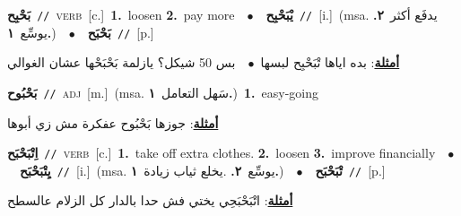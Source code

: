\documentclass[10pt,a4paper,twoside]{article} %
\begin{document}
\begin{multicols}{2}
{{{{{\setlength\topsep{0pt}\textbf{\foreignlanguage{arabic}{بَحْبِح}}\ {\color{gray}\texttt{//}\color{black}}\ \textsc{verb}\ [c.]\ \textbf{1.}~loosen  \textbf{2.}~pay more\ \ $\bullet$\ \ \setlength\topsep{0pt}\textbf{\foreignlanguage{arabic}{يْبَحْبِح}}\ {\color{gray}\texttt{//}\color{black}}\ [i.]\ \color{gray}(msa. \foreignlanguage{arabic}{يدفَع أكثر}~\foreignlanguage{arabic}{\textbf{٢.}}  \foreignlanguage{arabic}{يوسِّع}~\foreignlanguage{arabic}{\textbf{١.}})\color{black}\ \ $\bullet$\ \ \setlength\topsep{0pt}\textbf{\foreignlanguage{arabic}{بَحْبَح}}\ {\color{gray}\texttt{//}\color{black}}\ [p.]\  \begin{flushright}\color{gray}\foreignlanguage{arabic}{\textbf{\underline{\foreignlanguage{arabic}{أمثلة}}}: بده اياها تْبَحْبِح لبسها\ $\bullet$\ \  بس 50 شيكل؟ يازلمة بَحْبَحْها عشان الغوالي}\end{flushright}\color{black}} \vspace{2mm}

{\setlength\topsep{0pt}\textbf{\foreignlanguage{arabic}{بَحْبُوح}}\ {\color{gray}\texttt{//}\color{black}}\ \textsc{adj}\ [m.]\ \color{gray}(msa. \foreignlanguage{arabic}{سَهل التعامل}~\foreignlanguage{arabic}{\textbf{١.}})\color{black}\ \textbf{1.}~easy-going\  \begin{flushright}\color{gray}\foreignlanguage{arabic}{\textbf{\underline{\foreignlanguage{arabic}{أمثلة}}}: جوزها بَحْبُوح عفكرة مش زي أبوها}\end{flushright}\color{black}} \vspace{2mm}

{\setlength\topsep{0pt}\textbf{\foreignlanguage{arabic}{اِتْبَحْبَح}}\ {\color{gray}\texttt{//}\color{black}}\ \textsc{verb}\ [c.]\ \textbf{1.}~take off extra clothes.  \textbf{2.}~loosen  \textbf{3.}~improve financially\ \ $\bullet$\ \ \setlength\topsep{0pt}\textbf{\foreignlanguage{arabic}{يِتْبَحْبَح}}\ {\color{gray}\texttt{//}\color{black}}\ [i.]\ \color{gray}(msa. \foreignlanguage{arabic}{يوسِّع}~\foreignlanguage{arabic}{\textbf{٢.}}  .\foreignlanguage{arabic}{يخلع ثياب زيادة}~\foreignlanguage{arabic}{\textbf{١.}})\color{black}\ \ $\bullet$\ \ \setlength\topsep{0pt}\textbf{\foreignlanguage{arabic}{تْبَحْبَح}}\ {\color{gray}\texttt{//}\color{black}}\ [p.]\  \begin{flushright}\color{gray}\foreignlanguage{arabic}{\textbf{\underline{\foreignlanguage{arabic}{أمثلة}}}: اتْبَحْبَحِي يختي فش حدا بالدار كل الزلام عالسطح}\end{flushright}\color{black}} \vspace{2mm}

}}}}
\end{multicols}
\end{document}
